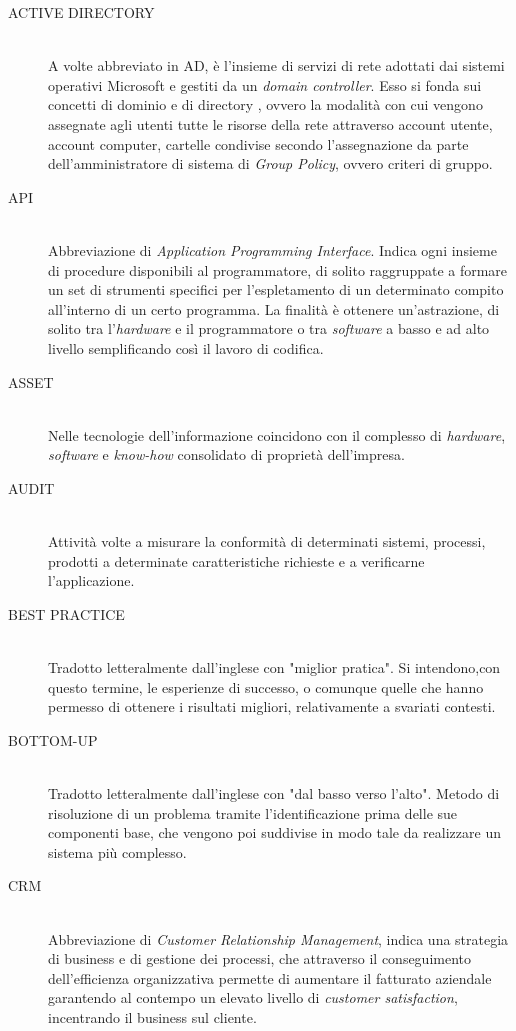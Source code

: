 
\begin{description}
  \item[ACTIVE DIRECTORY] \hfill \\ A volte abbreviato in AD, è l'insieme di servizi di rete adottati dai sistemi operativi Microsoft e gestiti da un \emph{domain controller}. Esso si fonda sui concetti di dominio e di directory , ovvero la modalità con cui vengono assegnate agli utenti tutte le risorse della rete attraverso account utente, account computer, cartelle condivise secondo l'assegnazione da parte dell'amministratore di sistema di \emph{Group Policy}, ovvero criteri di gruppo.
  \item[API] \hfill \\ Abbreviazione di \emph{Application Programming Interface}. Indica ogni insieme di procedure disponibili al programmatore, di solito raggruppate a formare un set di strumenti specifici per l’espletamento di un determinato compito all’interno di un certo programma. La finalità è ottenere un’astrazione, di solito tra l’\emph{hardware} e il programmatore o tra \emph{software} a basso e ad alto livello semplificando così il lavoro di codifica.
  \item[ASSET] \hfill \\ Nelle tecnologie dell’informazione coincidono con il complesso di \emph{hardware}, \emph{software} e \emph{know-how} consolidato di proprietà dell’impresa.
  \item[AUDIT] \hfill \\ Attività volte a misurare la conformità di determinati sistemi, processi, prodotti a determinate caratteristiche richieste e a verificarne l'applicazione. 
  \item[BEST PRACTICE] \hfill \\ Tradotto letteralmente dall’inglese con "miglior pratica". Si intendono,con questo termine, le esperienze di successo, o comunque quelle che hanno permesso di ottenere i risultati migliori, relativamente a svariati contesti.
  \item[BOTTOM-UP] \hfill \\ Tradotto letteralmente dall’inglese con "dal basso verso l’alto". Metodo di risoluzione di un problema tramite l’identificazione prima delle sue componenti base, che vengono poi suddivise in modo tale da realizzare un sistema più complesso.
  \item[CRM] \hfill \\ Abbreviazione di \emph{Customer Relationship Management}, indica una strategia di business e di gestione dei processi, che attraverso il conseguimento dell’efficienza organizzativa permette di aumentare il fatturato aziendale garantendo al contempo un elevato livello di \emph{customer satisfaction}, incentrando il business sul cliente. 

\end{description}
